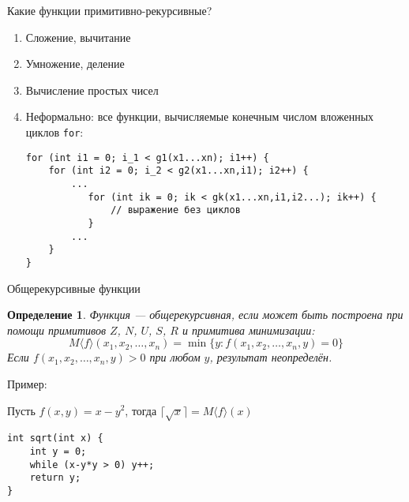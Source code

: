 \documentclass[aspectratio=169]{beamer}
\newtheorem{dfn}{Определение}[section]
\begin{document}
\begin{frame}[fragile]{Какие функции примитивно-рекурсивные?}
\begin{enumerate}
\item Сложение, вычитание\pause
\item Умножение, деление\pause
\item Вычисление простых чисел\pause
\item Неформально: все функции, вычисляемые конечным числом вложенных циклов \verb!for!:

\begin{verbatim}
for (int i1 = 0; i_1 < g1(x1...xn); i1++) {
    for (int i2 = 0; i_2 < g2(x1...xn,i1); i2++) {
        ...
           for (int ik = 0; ik < gk(x1...xn,i1,i2...); ik++) {
               // выражение без циклов
           }
        ...
    }
}
\end{verbatim}
\end{enumerate}
\end{frame}

\begin{frame}[fragile]{Общерекурсивные функции}
\begin{dfn}
Функция --- общерекурсивная, если может быть построена при помощи
примитивов $Z$, $N$, $U$, $S$, $R$ и примитива минимизации:
$$M\langle f \rangle (x_1,x_2,\dots,x_n) = \min\{y: f(x_1,x_2,\dots,x_n,y) = 0\}$$
Если $f(x_1,x_2,\dots,x_n,y) > 0$ при любом $y$, результат неопределён.
\end{dfn}\pause


Пример:

Пусть $f(x,y) = x-y^2$, тогда $\lceil\sqrt{x}\rceil = M\langle f\rangle (x)$

\begin{verbatim}
int sqrt(int x) {
    int y = 0;
    while (x-y*y > 0) y++;
    return y;
}
\end{verbatim}

\end{frame}
\end{document}
